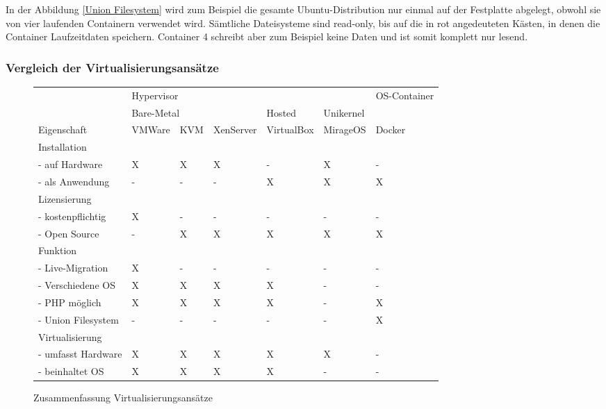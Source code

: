In der Abbildung \ref{Union Filesystem} wird zum Beispiel die gesamte Ubuntu-Distribution nur einmal auf der Festplatte abgelegt, obwohl sie von vier laufenden Containern verwendet wird. Sämtliche Dateisysteme sind read-only, bis auf die in rot angedeuteten Kästen, in denen die Container Laufzeitdaten speichern. Container 4 schreibt aber zum Beispiel keine Daten und ist somit komplett nur lesend.

\subsubsection{Vergleich der Virtualisierungsansätze}

\begin{figure}[!ht]
  \begin{center}
    \resizebox{15cm}{!} {
      \begin{tabular}{|l|l|l|l|l|l|l|}
      \hline
      {} & \multicolumn{5}{|l|}{Hypervisor} & OS-Container \\
      \cline{2-6}
      {} & \multicolumn{3}{|l|}{Bare-Metal} & Hosted & Unikernel & {} \\
      \hline
      Eigenschaft & VMWare & KVM & XenServer & VirtualBox & MirageOS & Docker \\
      \hline
      Installation & \multicolumn{6}{|l|}{} \\
      \hline
      - auf Hardware & X & X & X & - & X & - \\
      \hline
      - als Anwendung & - & - & - & X & X & X \\
      \hline
      Lizensierung & \multicolumn{6}{|l|}{} \\
      \hline
      - kostenpflichtig & X & - & - & - & - & - \\
      \hline
      - Open Source & - & X & X & X & X & X \\
      \hline
      Funktion & \multicolumn{6}{|l|}{} \\
      \hline
      - Live-Migration & X & - & - & - & - & - \\
      \hline
      - Verschiedene OS & X & X & X & X & - & - \\
      \hline
      - PHP möglich & X & X & X & X & - & X \\
      \hline
      - Union Filesystem & - & - & - & - & - & X \\
      \hline
      Virtualisierung & \multicolumn{6}{|l|}{} \\
      \hline
      - umfasst Hardware & X & X & X & X & X & - \\
      \hline
      - beinhaltet OS & X & X & X & X & - & - \\      
      \hline
      \end{tabular}
    }
    \caption{Zusammenfassung Virtualisierungsansätze}
  \end{center}
\end{figure}

